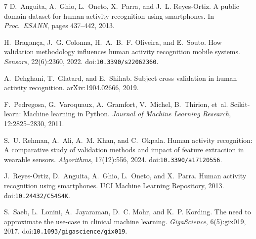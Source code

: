 \documentclass{article}
\begin{document}
{\footnotesize\setlength{\bibsep}{1pt}
\begin{thebibliography}{7}
D.~Anguita, A.~Ghio, L.~Oneto, X.~Parra, and J.~L. Reyes-Ortiz.
\newblock A public domain dataset for human activity recognition using smartphones.
\newblock In \emph{Proc.\ ESANN}, pages 437--442, 2013.

H.~Bragan{\c{c}}a, J.~G. Colonna, H.~A.~B.~F. Oliveira, and E.~Souto.
\newblock How validation methodology influences human activity recognition mobile systems.
\newblock \emph{Sensors}, 22(6):2360, 2022. doi:\nolinkurl{10.3390/s22062360}.

A.~Dehghani, T.~Glatard, and E.~Shihab.
\newblock Subject cross validation in human activity recognition.
\newblock arXiv:1904.02666, 2019.

F.~Pedregosa, G.~Varoquaux, A.~Gramfort, V.~Michel, B.~Thirion, et~al.
\newblock Scikit-learn: Machine learning in {P}ython.
\newblock \emph{Journal of Machine Learning Research}, 12:2825--2830, 2011.

S.~U. Rehman, A.~Ali, A.~M. Khan, and C.~Okpala.
\newblock Human activity recognition: A comparative study of validation methods and impact of feature extraction in wearable sensors.
\newblock \emph{Algorithms}, 17(12):556, 2024. doi:\nolinkurl{10.3390/a17120556}.

J.~Reyes-Ortiz, D.~Anguita, A.~Ghio, L.~Oneto, and X.~Parra.
\newblock Human activity recognition using smartphones.
\newblock UCI Machine Learning Repository, 2013. doi:\nolinkurl{10.24432/C54S4K}.

S.~Saeb, L.~Lonini, A.~Jayaraman, D.~C. Mohr, and K.~P. Kording.
\newblock The need to approximate the use-case in clinical machine learning.
\newblock \emph{GigaScience}, 6(5):gix019, 2017. doi:\nolinkurl{10.1093/gigascience/gix019}.
\end{thebibliography}
}
\end{document}
